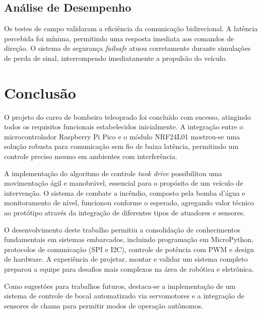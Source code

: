 \documentclass[
	12pt,				
	openright,			
	oneside,			
	a4paper,			
	english,			
	brazilian			
	]{abntex2}
\begin{document}
\section{Análise de Desempenho}

Os testes de campo validaram a eficiência da comunicação bidirecional. A latência percebida foi mínima, permitindo uma resposta imediata aos comandos de direção. O sistema de segurança \textit{failsafe} atuou corretamente durante simulações de perda de sinal, interrompendo imediatamente a propulsão do veículo.

\chapter{Conclusão}

O projeto do carro de bombeiro teleoprado foi concluído com sucesso, atingindo todos os requisitos funcionais estabelecidos inicialmente. A integração entre o microcontrolador Raspberry Pi Pico e o módulo NRF24L01 mostrou-se uma solução robusta para comunicação sem fio de baixa latência, permitindo um controle preciso mesmo em ambientes com interferência.

A implementação do algoritmo de controle \textit{tank drive} possibilitou uma movimentação ágil e manobrável, essencial para o propósito de um veículo de intervenção. O sistema de combate a incêndio, composto pela bomba d'água e monitoramento de nível, funcionou conforme o esperado, agregando valor técnico ao protótipo através da integração de diferentes tipos de atuadores e sensores.

O desenvolvimento deste trabalho permitiu a consolidação de conhecimentos fundamentais em sistemas embarcados, incluindo programação em MicroPython, protocolos de comunicação (SPI e I2C), controle de potência com PWM e design de hardware. A experiência de projetar, montar e validar um sistema completo preparou a equipe para desafios mais complexos na área de robótica e eletrônica.

Como sugestões para trabalhos futuros, destaca-se a implementação de um sistema de controle de bocal automatizado via servomotores e a integração de sensores de chama para permitir modos de operação autônomos.

\postextual


\end{document}

